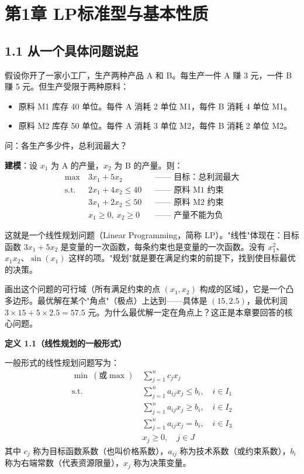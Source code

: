 \section{第1章 \quad LP标准型与基本性质}

\subsection{1.1 从一个具体问题说起}

假设你开了一家小工厂，生产两种产品 A 和 B。每生产一件 A 赚 3 元，一件 B 赚 5 元。但生产受限于两种原料：
\begin{itemize}
  \item 原料 M1 库存 40 单位。每件 A 消耗 2 单位 M1，每件 B 消耗 4 单位 M1。
  \item 原料 M2 库存 50 单位。每件 A 消耗 3 单位 M2，每件 B 消耗 2 单位 M2。
\end{itemize}
问：各生产多少件，总利润最大？

\textbf{建模}：设 $x_1$ 为 A 的产量，$x_2$ 为 B 的产量。则：
\[
\begin{aligned}
\max\ & 3x_1 + 5x_2 && \text{—— 目标：总利润最大} \\
\text{s.t.}\ & 2x_1 + 4x_2 \le 40 && \text{—— 原料 M1 约束} \\
& 3x_1 + 2x_2 \le 50 && \text{—— 原料 M2 约束} \\
& x_1 \ge 0,\ x_2 \ge 0 && \text{—— 产量不能为负}
\end{aligned}
\]

这就是一个线性规划问题（Linear Programming，简称 LP）。"线性"体现在：目标函数 $3x_1+5x_2$ 是变量的一次函数，每条约束也是变量的一次函数。没有 $x_1^2$、$x_1x_2$、$\sin(x_1)$ 这样的项。"规划"就是要在满足约束的前提下，找到使目标最优的决策。

画出这个问题的可行域（所有满足约束的点 $(x_1,x_2)$ 构成的区域），它是一个凸多边形。最优解在某个"角点"（极点）上达到——具体是 $(15, 2.5)$，最优利润 $3\times 15 + 5\times 2.5 = 57.5$ 元。为什么最优解一定在角点上？这正是本章要回答的核心问题。

\smallskip
\textbf{定义 1.1（线性规划的一般形式）}

一般形式的线性规划问题写为：
\[
\begin{aligned}
\min\ (\text{或}\max)\ & \sum_{j=1}^n c_j x_j \\
\text{s.t.}\ & \sum_{j=1}^n a_{ij} x_j \le b_i,\quad i\in I_1 \\
& \sum_{j=1}^n a_{ij} x_j \ge b_i,\quad i\in I_2 \\
& \sum_{j=1}^n a_{ij} x_j = b_i,\quad i\in I_3 \\
& x_j \ge 0,\quad j\in J
\end{aligned}
\]
其中 $c_j$ 称为目标函数系数（也叫价格系数），$a_{ij}$ 称为技术系数（或约束系数），$b_i$ 称为右端常数（代表资源限量），$x_j$ 称为决策变量。

